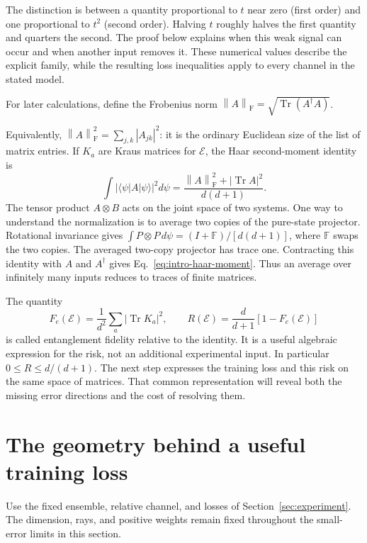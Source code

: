 \documentclass[11pt,a4paper]{article}
\newcommand{\ket}[1]{\lvert #1\rangle}
\newcommand{\bra}[1]{\langle #1\rvert}
\newcommand{\Tr}{\operatorname{Tr}}
\newcommand{\normF}[1]{\left\lVert #1\right\rVert_{\mathrm F}}
\newcommand{\abs}[1]{\left\lvert #1\right\rvert}
\numberwithin{equation}{section}
\begin{document}
The distinction is between a quantity proportional to $t$ near zero
(first order) and one proportional to $t^2$ (second order). Halving $t$
roughly halves the first quantity and quarters the second. The proof below
explains when this weak signal can occur and when another input removes it.
These numerical values describe the explicit family, while the resulting
loss inequalities apply to every channel in the stated model.

For later calculations, define the Frobenius norm $\normF A=\sqrt{\Tr(A^\dagger A)}$.

Equivalently, $\normF A^2=\sum_{j,k}|A_{jk}|^2$: it is the ordinary
Euclidean size of the list of matrix entries. If $K_a$ are Kraus matrices for $\mathcal E$, the Haar second-moment identity is
\begin{equation}
 \int\abs{\bra\psi A\ket\psi}^2d\psi
 =\frac{\normF A^2+\abs{\Tr A}^2}{d(d+1)}.
 \label{eq:intro-haar-moment}
\end{equation}
The tensor product $A\otimes B$ acts on the joint space of two systems. One way to understand the normalization is to average two copies of the pure-state projector. Rotational invariance gives
$\int P\otimes P\,d\psi=(I+\mathbb F)/[d(d+1)]$, where $\mathbb F$ swaps the two copies. The averaged two-copy projector has trace one. Contracting this identity with $A$ and $A^\dagger$ gives Eq.~\eqref{eq:intro-haar-moment}. Thus an average over infinitely many inputs reduces to traces of finite matrices.

The quantity
\begin{equation}
 F_e(\mathcal E)=\frac1{d^2}\sum_a\abs{\Tr K_a}^2,
 \qquad R(\mathcal E)=\frac d{d+1}[1-F_e(\mathcal E)]
 \label{eq:intro-entanglement-fidelity}
\end{equation}
is called entanglement fidelity relative to the identity. It is a useful algebraic expression for the risk, not an additional experimental input. In particular $0\le R\le d/(d+1)$. The next step expresses the training loss and this risk on the same space of matrices. That common representation will reveal both the missing error directions and the cost of resolving them.

\section{The geometry behind a useful training loss}
\label{sec:geometry}

Use the fixed ensemble, relative channel, and losses of Section~\ref{sec:experiment}. The dimension, rays, and positive weights remain fixed throughout the small-error limits in this section.
\end{document}
